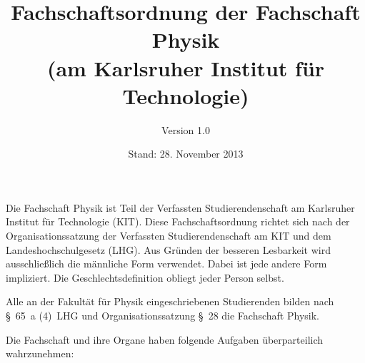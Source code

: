 \documentclass[a4paper, parskip=half, numbers=noenddot]{scrartcl}
\title{Fachschaftsordnung der Fachschaft Physik\\(am Karlsruher Institut für Technologie)}
\author{Version 1.0}
\date{Stand: 28. November 2013}
\begin{document}
%
%

\maketitle
\thispagestyle{empty}

\pagestyle{empty}
\newpage
\rule{0mm}{0mm}
\newpage


\begin{contract}

\setcounter{page}{1}
\pagestyle{plain}


%
%

\tableofcontents
\newpage


%
%

Die Fachschaft Physik ist Teil der Verfassten Studierendenschaft am Karlsruher Institut für Technologie (KIT). Diese Fachschaftsordnung richtet sich nach der Organisationssatzung der Verfassten Studierendenschaft am KIT und dem Landeshochschulgesetz (LHG). Aus Gründen der besseren Lesbarkeit wird ausschließlich die männliche Form verwendet. Dabei ist jede andere Form impliziert. Die Geschlechtsdefinition obliegt jeder Person selbst.


%
%


Alle an der Fakultät für Physik eingeschriebenen Studierenden
bilden nach §~65~a (4)~LHG und Organisationssatzung §~28 die Fachschaft Physik.


%
%

%
\label{fs:aufgaben}

Die Fachschaft und ihre Organe haben folgende Aufgaben überparteilich wahrzunehmen:


\end{contract}
\end{document}
